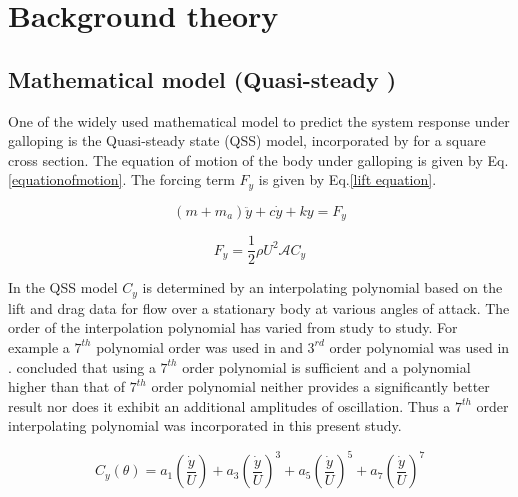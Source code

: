 
\section{Background theory}

\subsection{Mathematical model (Quasi-steady )}

 One of the widely used mathematical model to predict the system response under galloping is the Quasi-steady state (QSS) model, incorporated by \cite{Parkinson1964} for a square cross section. The equation of motion of the body under galloping is given by Eq. \eqref{equationofmotion}. The forcing term $F_y$ is given by Eq.\eqref{lift equation}.
 
 

\begin{equation}
\label{equationofmotion}
(m+m_a)\ddot{y}+c\dot{y}+ky=F_y
\end{equation}

\begin{equation}
\label{lift equation}
F_y=\frac{1}{2}\rho U^2\mathcal{A}C_y
\end{equation}

 In the QSS  model $C_y$ is determined by an interpolating polynomial based on the lift and drag data  for flow over a stationary body at various angles of attack. The order of the interpolation polynomial has varied from study to study. For  example a $7^{th}$ polynomial order was used in \cite{Parkinson1964} and $3^{rd}$ order polynomial was used in \cite{Barrero-Gil2009}. \cite{Ng2005} concluded that using a $7^{th}$ order polynomial is sufficient and a polynomial higher than that of $7^{th}$ order polynomial neither provides a significantly better result nor does it exhibit an additional amplitudes of oscillation. Thus a $7 ^{th}$ order interpolating polynomial was incorporated in this present study. 

\begin{equation}
\label{cy ploynomial}
C_y(\theta)=a_1\left(\frac{\dot{y}}{U}\right)+a_3\left(\frac{\dot{y}}{U}\right)^3+a_5\left(\frac{\dot{y}}{U}\right)^5+a_7\left(\frac{\dot{y}}{U}\right)^7
\end{equation}


